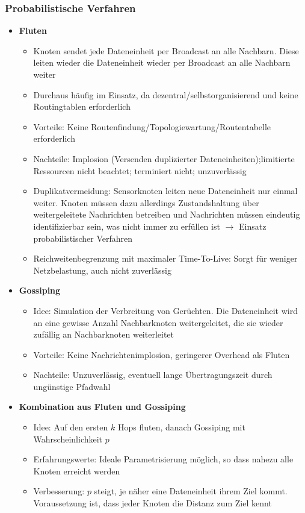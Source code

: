 \subsubsection{Probabilistische Verfahren}
\begin{itemize}
	\item \textbf{Fluten}
	\begin{itemize}
		\item Knoten sendet jede Dateneinheit per Broadcast an alle Nachbarn. Diese leiten wieder die Dateneinheit wieder per Broadcast an alle Nachbarn weiter
		\item Durchaus häufig im Einsatz, da dezentral/selbstorganisierend und keine Routingtablen erforderlich
		\item Vorteile: Keine Routenfindung/Topologiewartung/Routentabelle erforderlich
		\item Nachteile: Implosion (Versenden duplizierter Dateneinheiten);limitierte Ressourcen nicht beachtet; terminiert nicht; unzuverlässig
		\item Duplikatvermeidung: Sensorknoten leiten neue Dateneinheit nur einmal weiter. Knoten müssen dazu allerdings Zustandshaltung über weitergeleitete Nachrichten betreiben und Nachrichten müssen eindeutig identifizierbar sein, was nicht immer zu erfüllen ist \(\rightarrow\) Einsatz probabilistischer Verfahren
		\item Reichweitenbegrenzung mit maximaler Time-To-Live: Sorgt für weniger Netzbelastung, auch nicht zuverlässig
	\end{itemize}
	\item \textbf{Gossiping}
	\begin{itemize}
		\item Idee: Simulation der Verbreitung von Gerüchten. Die Dateneinheit wird an eine gewisse Anzahl Nachbarknoten weitergeleitet, die sie wieder zufällig an Nachbarknoten weiterleitet
		\item Vorteile: Keine Nachrichtenimplosion, geringerer Overhead als Fluten
		\item Nachteile: Unzuverlässig, eventuell lange Übertragungszeit durch ungünstige Pfadwahl
	\end{itemize}
	\item \textbf{Kombination aus Fluten und Gossiping}
	\begin{itemize}
		\item Idee: Auf den ersten \(k\) Hops fluten, danach Gossiping mit Wahrscheinlichkeit \(p\)
		\item Erfahrungswerte: Ideale Parametrisierung möglich, so dass nahezu alle Knoten erreicht werden
		\item Verbesserung: \(p\) steigt, je näher eine Dateneinheit ihrem Ziel kommt. Voraussetzung ist, dass jeder Knoten die Distanz zum Ziel kennt
	\end{itemize}
\end{itemize}

